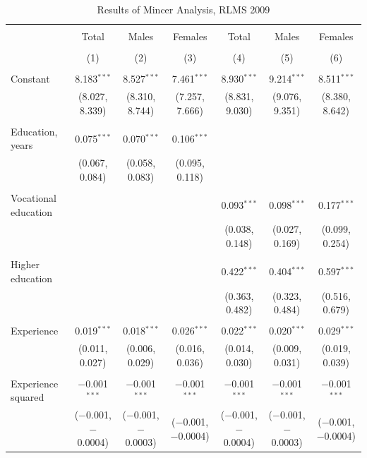\documentclass[alpha-refs]{wiley-article-01g}
\begin{document}
\begin{landscape}

\fontsize{9}{11}
\selectfont

\begin{table}[!htbp] \centering 
\renewcommand{\arraystretch}{1.0}
  \caption{Results of Mincer Analysis, RLMS 2009} 
  \label{} 
\begin{tabular}{@{\extracolsep{5pt}}lcccccc} 
\\[-1.8ex]\hline 
\hline \\[-1.8ex] 
 & Total & Males & Females & Total & Males & Females \\ 
\\[-1.8ex] & (1) & (2) & (3) & (4) & (5) & (6)\\ 
\hline \\[-1.8ex] 
 Constant & 8.183$^{***}$ & 8.527$^{***}$ & 7.461$^{***}$ & 8.930$^{***}$ & 9.214$^{***}$ & 8.511$^{***}$ \\ 
  & (8.027, 8.339) & (8.310, 8.744) & (7.257, 7.666) & (8.831, 9.030) & (9.076, 9.351) & (8.380, 8.642) \\ 
  & & & & & & \\ 
 Education, years & 0.075$^{***}$ & 0.070$^{***}$ & 0.106$^{***}$ &  &  &  \\ 
  & (0.067, 0.084) & (0.058, 0.083) & (0.095, 0.118) &  &  &  \\ 
  & & & & & & \\ 
 Vocational education &  &  &  & 0.093$^{***}$ & 0.098$^{***}$ & 0.177$^{***}$ \\ 
  &  &  &  & (0.038, 0.148) & (0.027, 0.169) & (0.099, 0.254) \\ 
  & & & & & & \\ 
 Higher education &  &  &  & 0.422$^{***}$ & 0.404$^{***}$ & 0.597$^{***}$ \\ 
  &  &  &  & (0.363, 0.482) & (0.323, 0.484) & (0.516, 0.679) \\ 
  & & & & & & \\ 
 Experience & 0.019$^{***}$ & 0.018$^{***}$ & 0.026$^{***}$ & 0.022$^{***}$ & 0.020$^{***}$ & 0.029$^{***}$ \\ 
  & (0.011, 0.027) & (0.006, 0.029) & (0.016, 0.036) & (0.014, 0.030) & (0.009, 0.031) & (0.019, 0.039) \\ 
  & & & & & & \\ 
 Experience squared & $-$0.001$^{***}$ & $-$0.001$^{***}$ & $-$0.001$^{***}$ & $-$0.001$^{***}$ & $-$0.001$^{***}$ & $-$0.001$^{***}$ \\ 
  & ($-$0.001, $-$0.0004) & ($-$0.001, $-$0.0003) & ($-$0.001, $-$0.0004) & ($-$0.001, $-$0.0004) & ($-$0.001, $-$0.0003) & ($-$0.001, $-$0.0004) \\ 

\end{tabular}
\end{table}
\end{landscape}
\end{document}
